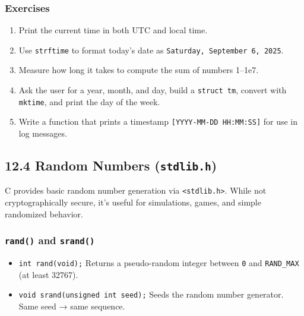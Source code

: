 \documentclass[
  letterpaper,
  DIV=11,
  numbers=noendperiod]{scrreprt}
\providecommand{\tightlist}{%
  \setlength{\itemsep}{0pt}\setlength{\parskip}{0pt}}
\begin{document}
\subsubsection{Exercises}\label{exercises-57}

\begin{enumerate}
\def\labelenumi{\arabic{enumi}.}
\tightlist
\item
  Print the current time in both UTC and local time.
\item
  Use \texttt{strftime} to format today's date as
  \texttt{Saturday,\ September\ 6,\ 2025}.
\item
  Measure how long it takes to compute the sum of numbers 1--1e7.
\item
  Ask the user for a year, month, and day, build a \texttt{struct\ tm},
  convert with \texttt{mktime}, and print the day of the week.
\item
  Write a function that prints a timestamp
  \texttt{{[}YYYY-MM-DD\ HH:MM:SS{]}} for use in log messages.
\end{enumerate}

\subsection{\texorpdfstring{12.4 Random Numbers
(\texttt{stdlib.h})}{12.4 Random Numbers (stdlib.h)}}\label{random-numbers-stdlib.h}

C provides basic random number generation via
\texttt{\textless{}stdlib.h\textgreater{}}. While not cryptographically
secure, it's useful for simulations, games, and simple randomized
behavior.

\subsubsection{\texorpdfstring{\texttt{rand()} and
\texttt{srand()}}{rand() and srand()}}\label{rand-and-srand}

\begin{itemize}
\item
  \texttt{int\ rand(void);} Returns a pseudo-random integer between
  \texttt{0} and \texttt{RAND\_MAX} (at least 32767).
\item
  \texttt{void\ srand(unsigned\ int\ seed);} Seeds the random number
  generator. Same seed → same sequence.
\end{itemize}
\end{document}
